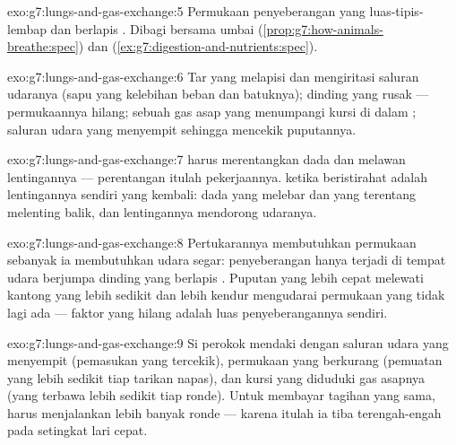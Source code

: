 \begin{solution}{exo:g7:lungs-and-gas-exchange:5}
Permukaan penyeberangan yang luas-tipis-lembap dan berlapis .
Dibagi bersama umbai 
(\cref{prop:g7:how-animals-breathe:spec}) dan 
(\cref{ex:g7:digestion-and-nutrients:spec}).
\end{solution}

\begin{solution}{exo:g7:lungs-and-gas-exchange:6}
Tar yang melapisi dan mengiritasi saluran udaranya (sapu yang
kelebihan beban dan batuknya); dinding  yang rusak ---
permukaannya hilang; sebuah gas asap yang menumpangi kursi  di
dalam ; saluran udara yang menyempit sehingga mencekik
puputannya.
\end{solution}

\begin{solution}{exo:g7:lungs-and-gas-exchange:7}
 harus merentangkan dada dan  melawan
lentingannya --- perentangan itulah pekerjaannya. 
ketika beristirahat adalah lentingannya sendiri yang kembali: dada
yang melebar dan  yang terentang melenting balik, dan
lentingannya mendorong udaranya.
\end{solution}

\begin{solution}{exo:g7:lungs-and-gas-exchange:8}
Pertukarannya membutuhkan permukaan sebanyak ia membutuhkan udara
segar: penyeberangan hanya terjadi di tempat udara berjumpa dinding
yang berlapis . Puputan yang lebih cepat melewati kantong yang
lebih sedikit dan lebih kendur mengudarai permukaan yang tidak lagi
ada --- faktor yang hilang adalah luas penyeberangannya sendiri.
\end{solution}

\begin{solution}{exo:g7:lungs-and-gas-exchange:9}
Si perokok mendaki dengan saluran udara yang menyempit (pemasukan yang
tercekik), permukaan  yang berkurang (pemuatan yang lebih
sedikit tiap tarikan napas), dan kursi  yang diduduki gas
asapnya (yang terbawa lebih sedikit tiap ronde). Untuk membayar
tagihan  yang sama,  harus menjalankan lebih banyak
ronde --- karena itulah ia tiba terengah-engah pada 
setingkat lari cepat.
\end{solution}

